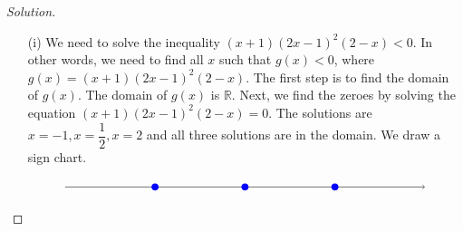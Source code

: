 \documentclass[12pt]{article}
\newenvironment{solution}{\begin{proof}[Solution]}{\end{proof}}
\begin{document}
\begin{enumerate}
\begin{solution}
\begin{itemize}
				We need to solve the inequality $\dfrac{-5}{x+2}\geq 0$. In other words, we need to find all $x$ such that $g(x) \geq 0$, where $g(x)=\dfrac{-5}{x+2}$. The first step is to find the domain of $g(x)$. The domain of $g(x)$ is $(-\infty, -2) \cup (-2, \infty) $. Next, we find the zeroes by solving the equation $g(x)=0$.
				\begin{align*}
					\dfrac{-5}{x+2}&=0\\
					-5&=0
				\end{align*}
				
				so this equation has no solutions, and hence $g(x)$ has no zeroes. This does NOT mean we cannot solve the inequality. 
				
				We can still draw a sign chart. 
				
				\[
				\begin{tikzpicture}[scale=1]
					\draw[->] (-4,0) -- (0,0);
					
					\draw[blue, thick, fill=white] (-2,0) circle (2.5pt);
					
					\node at (-2, .5) {-2};
					\node at (-5,.5) {$g\colon$};
					\node at (-3.5,.5) {$+$};
					\node at (-0.5,.5) {$-$};
				\end{tikzpicture}
				\]		
				
				Since we are trying to find all $x$ such that $\dfrac{-5}{x+2}$ is positive or equal to $0$, using the sign chart, we conclude that the solution is $(-\infty,-2)$.
				\item[(i)] 		We need to solve the inequality $(x+1)(2x-1)^2(2-x)< 0$. In other words, we need to find all $x$ such that $g(x) < 0$, where $g(x)=(x+1)(2x-1)^2(2-x)$. The first step is to find the domain of $g(x)$. The domain of $g(x)$ is $\mathbb{R}$. Next, we find the zeroes by solving the equation $(x+1)(2x-1)^2(2-x)=0$. The solutions are $x=-1,x=\dfrac{1}{2},x=2$ and all three solutions are in the domain.
				We draw a sign chart. 
				
				\[
				\begin{tikzpicture}[scale=1]
					\draw[->] (-7,0) -- (3,0);
					
					\draw (-2,0) node[circle,blue,fill,inner sep=2pt]{};
					\draw (-4.5,0) node[circle,blue,fill,inner sep=2pt]{};
					\draw (0.5,0) node[circle,blue,fill,inner sep=2pt]{};
					

\end{tikzpicture}\]
\end{itemize}
\end{solution}
\end{enumerate}
\end{document}
